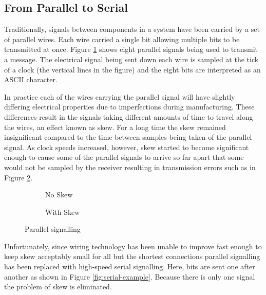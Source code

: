 		\subsection{From Parallel to Serial}
			
			Traditionally, signals between components in a system have been carried by
			a set of parallel wires. Each wire carried a single bit allowing multiple
			bits to be transmitted at once. Figure \ref{fig:parallel-example-no-skew}
			shows eight parallel signals being used to transmit a message. The
			electrical signal being sent down each wire is sampled at the tick of a
			clock (the vertical lines in the figure) and the eight bits are
			interpreted as an ASCII character.
			
			In practice each of the wires carrying the parallel signal will have
			slightly differing electrical properties due to imperfections during
			manufacturing. These differences result in the signals taking different
			amounts of time to travel along the wires, an effect known as skew. For a
			long time the skew remained insignificant compared to the time between
			samples being taken of the parallel signal. As clock speeds increased,
			however, skew started to become significant enough to cause some of the
			parallel signals to arrive so far apart that some would not be sampled by
			the receiver resulting in transmission errors such as in Figure
			\ref{fig:parallel-example-skew}.
			
			\begin{figure}
				\begin{subfigure}[b]{0.49\textwidth}
					\center
					
					\caption{No Skew}
					\label{fig:parallel-example-no-skew}
				\end{subfigure}
				\begin{subfigure}[b]{0.49\textwidth}
					\center
					
					\caption{With Skew}
					\label{fig:parallel-example-skew}
				\end{subfigure}
				
				\caption{Parallel signalling}
				\label{fig:parallel-example}
			\end{figure}
			
			Unfortunately, since wiring technology has been unable to improve fast
			enough to keep skew acceptably small for all but the shortest connections
			parallel signalling has been replaced with high-speed serial signalling.
			Here, bits are sent one after another as shown in Figure
			\ref{fig:serial-example}. Because there is only one signal the problem of
			skew is eliminated.
			
